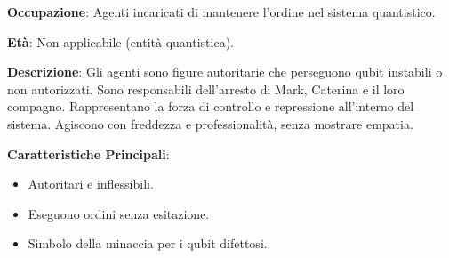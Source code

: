 \vspace{0.5cm}

\begin{tcolorbox}[colback=white,colframe=black,title=\textbf{Agenti della Quantum Control Electronics}]
\begin{multicols}{2}
\textbf{Occupazione}: Agenti incaricati di mantenere l'ordine nel sistema quantistico.

\textbf{Età}: Non applicabile (entità quantistica).

\textbf{Descrizione}: Gli agenti sono figure autoritarie che perseguono qubit instabili o non autorizzati. Sono responsabili dell'arresto di Mark, Caterina e il loro compagno. Rappresentano la forza di controllo e repressione all'interno del sistema. Agiscono con freddezza e professionalità, senza mostrare empatia.

\textbf{Caratteristiche Principali}:
\begin{itemize}
    \item Autoritari e inflessibili.
    \item Eseguono ordini senza esitazione.
    \item Simbolo della minaccia per i qubit difettosi.
\end{itemize}
\end{multicols}
\end{tcolorbox}

\vspace{0.5cm}

